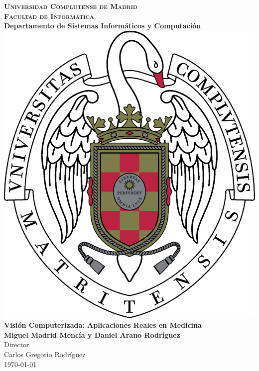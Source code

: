 
\begin{titlepage}
\begin{center}

  \textbf{\textsc{\LARGE Universidad Complutense de Madrid}}\\[1cm]
  \textbf{\textsc{\Large Facultad de Informática}}\\
  \textbf{Departamento de Sistemas Informáticos y Computación}\\[2cm]
  \includegraphics[scale=0.17]{imagenes/logo-ucm.pdf}\\[2cm]
  \textbf{\LARGE Visión Computerizada: Aplicaciones Reales en Medicina}\\[1cm]
  \textbf{\large Miguel Madrid Mencía y Daniel Arano Rodríguez}\\[2cm]
  Director\\
  \large Carlos Gregorio Rodríguez\\
  \vfill
  \today
\end{center}
\end{titlepage}
